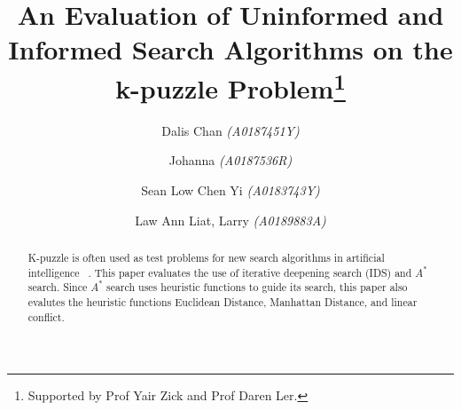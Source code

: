 \documentclass[runningheads]{llncs}
\begin{document}
%
\title{An Evaluation of Uninformed and Informed Search Algorithms on the k-puzzle Problem\thanks{Supported by Prof Yair Zick and Prof Daren Ler.}}
%
%
\author{Dalis Chan \textit{(A0187451Y)} \and
Johanna \textit{(A0187536R)} \and
Sean Low Chen Yi \textit{(A0183743Y)} \and 
Law Ann Liat, Larry \textit{(A0189883A)}}

%
%

%
\maketitle              %
%
\begin{abstract}
K-puzzle is often used as test problems for new search algorithms in artificial intelligence ~\cite[p71]{stuart_russell_artifical_2010}. This paper evaluates the use of iterative deepening search (IDS) and \( A^* \) search. 
Since \( A^* \) search uses heuristic functions to guide its search, this paper also evalutes the heuristic functions Euclidean Distance, Manhattan Distance, and linear conflict.
\end{abstract}
%
%
%
\end{document}
